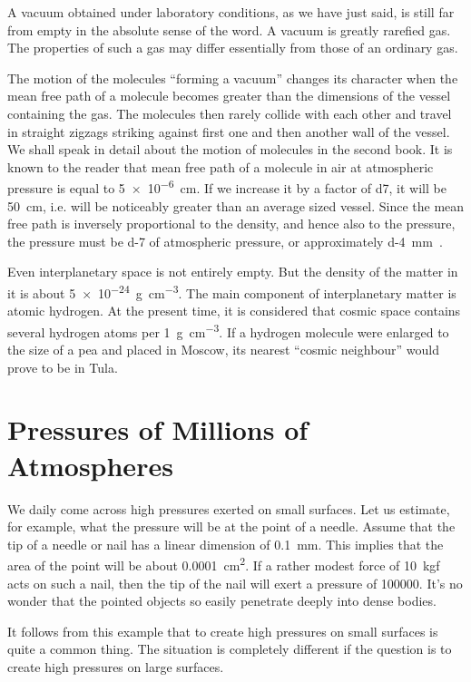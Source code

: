 A vacuum obtained under laboratory conditions, as we have just said, is still far from empty in the absolute sense of the word. A vacuum is greatly rarefied gas. The properties of such a gas may differ essentially from those of an ordinary gas.

The motion of the molecules ``forming a vacuum'' changes its character when the mean free path of a molecule becomes greater than the dimensions of the vessel containing the gas. The molecules then rarely collide with each other and travel in straight zigzags striking against first one and then another wall of the vessel. We shall speak in detail about the motion of molecules
in the second book. It is known to the reader that mean free path of a molecule in air at atmospheric pressure is equal to \SI{5e-6}{\centi\meter}. If we increase it by a factor of \num{d7}, it will be \SI{50}{\centi\meter}, i.e. will be noticeably greater than an average sized vessel. Since the mean free path is inversely proportional to the density, and hence also to the pressure, the pressure must be \num{d-7} of atmospheric pressure, or approximately \SI{d-4}{\milli\meter\mercury}.

Even interplanetary space is not entirely empty. But the density of the matter in it is about \SI{5e-24}{\gram\per\cubic\centi\metre}.
The main component of interplanetary matter is atomic hydrogen. At the present time, it is considered that cosmic space contains several hydrogen atoms per \SI{1}{\gram\per\centi\metre\cubed}. If a hydrogen molecule were enlarged to the size of a pea and placed in Moscow, its nearest  ``cosmic neighbour'' would prove to be in Tula.

\section{Pressures of Millions of Atmospheres}

We daily come across high pressures exerted on small surfaces. Let us estimate, for example, what the pressure will be at the point of a needle. Assume that the tip of a needle or nail has a linear dimension of \SI{0.1}{\milli\meter}. This implies that the area of the point will be about \SI{0.0001}{\centi\meter\squared}. If a rather modest force of \SI{10}{kgf} acts on such a nail, then the tip of the nail will exert a pressure of \SI{100000}{\atmos}. It's no wonder that the pointed objects so easily penetrate deeply into dense bodies.

It follows from this example that to create high pressures on small surfaces is quite a common thing. The situation is completely different if the question is to create high pressures on large surfaces.

